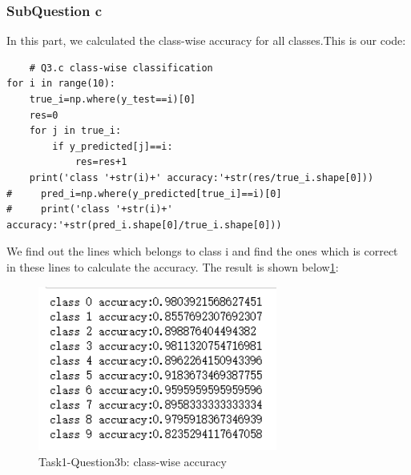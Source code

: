 \documentclass[conference]{IEEEtran}
\begin{document}
\subsubsection{SubQuestion c}
In this part, we calculated the class-wise accuracy for all classes.This is our code:
\begin{lstlisting}
    # Q3.c class-wise classification
for i in range(10):
    true_i=np.where(y_test==i)[0]
    res=0
    for j in true_i:
        if y_predicted[j]==i:
            res=res+1
    print('class '+str(i)+' accuracy:'+str(res/true_i.shape[0]))
#     pred_i=np.where(y_predicted[true_i]==i)[0]
#     print('class '+str(i)+' accuracy:'+str(pred_i.shape[0]/true_i.shape[0]))
\end{lstlisting}
We find out the lines which belongs to class i and find the ones which is correct in these lines to calculate the accuracy.
The result is shown below\ref{Fig.t1q3c}:
\begin{figure}[H] 
    \centering %
    \includegraphics[width=0.7\textwidth]{T1Q3c.png} %
    \caption{Task1-Question3b: class-wise accuracy} %
    \label{Fig.t1q3c} %
\end{figure}
\end{document}
